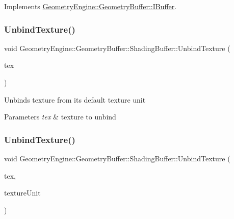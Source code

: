 Implements \mbox{\hyperlink{class_geometry_engine_1_1_geometry_buffer_1_1_i_buffer_a1136bf19a08f111e08648e66a8518b09}{Geometry\+Engine\+::\+Geometry\+Buffer\+::\+I\+Buffer}}.

\mbox{\label{class_geometry_engine_1_1_geometry_buffer_1_1_shading_buffer_acd58b856df03ec7eec5313356c3f8c46}} 
\subsubsection{\texorpdfstring{UnbindTexture()}{UnbindTexture()}\hspace{0.1cm}{\footnotesize\ttfamily [3/4]}}
{\footnotesize\ttfamily void Geometry\+Engine\+::\+Geometry\+Buffer\+::\+Shading\+Buffer\+::\+Unbind\+Texture (\begin{DoxyParamCaption}\item[{\mbox{\hyperlink{class_geometry_engine_1_1_geometry_buffer_1_1_shading_buffer_a8047a079ff9fb9fa3400651664c92ae9}{S\+H\+A\+D\+I\+N\+G\+B\+U\+F\+F\+E\+R\+\_\+\+T\+E\+X\+T\+U\+R\+E\+\_\+\+T\+Y\+PE}}}]{tex }\end{DoxyParamCaption})}

Unbinds texture from its default texture unit 
\begin{DoxyParams}{Parameters}
{\em tex} & texture to unbind \\
\hline
\end{DoxyParams}
\mbox{\label{class_geometry_engine_1_1_geometry_buffer_1_1_shading_buffer_ad80b99462f09f88f2937542b72d909f9}} 
\subsubsection{\texorpdfstring{UnbindTexture()}{UnbindTexture()}\hspace{0.1cm}{\footnotesize\ttfamily [4/4]}}
{\footnotesize\ttfamily void Geometry\+Engine\+::\+Geometry\+Buffer\+::\+Shading\+Buffer\+::\+Unbind\+Texture (\begin{DoxyParamCaption}\item[{\mbox{\hyperlink{class_geometry_engine_1_1_geometry_buffer_1_1_shading_buffer_a8047a079ff9fb9fa3400651664c92ae9}{S\+H\+A\+D\+I\+N\+G\+B\+U\+F\+F\+E\+R\+\_\+\+T\+E\+X\+T\+U\+R\+E\+\_\+\+T\+Y\+PE}}}]{tex,  }\item[{unsigned int}]{texture\+Unit }\end{DoxyParamCaption})}

